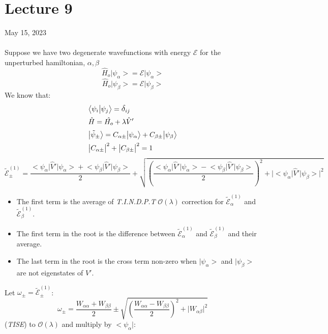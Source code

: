 \documentclass[12pt,fancychapters]{report}
\numberwithin{equation}{section}
\begin{document}
\section{Lecture 9}
May 15, 2023\\
\\
Suppose we have two degenerate wavefunctions with energy $\mathcal{E}$ for the unperturbed 
hamiltonian, $\alpha, \beta$
\[
  \hat{H}_o\big|\psi_\alpha\big> = \mathcal{E}\big|\psi_\alpha\big>
\]
\[
  \hat{H}_o\big|\psi_\beta\big> = \mathcal{E}\big|\psi_\beta\big>
\]
We know that:
\begin{align*}
  &\big<\psi_i\big|\psi_j\big>= \mathlarger{\delta}_{ij}\\ 
  &\hat{H} = \hat{H_o} + \lambda \hat{V}'\\
  &\big|\tilde{\psi}_\pm\big>= C_{\alpha\pm}\big|\psi_\alpha\big> + C_{\beta\pm}\big|
  \psi_\beta\big>\\
  &\big|C_{\alpha\pm}\big|^2 + \big|C_{\beta\pm}\big|^2 = 1
\end{align*}
\begin{equation*}
  \tilde{\mathcal{E}}_\pm^{(1)} =\frac{ \big<\psi_\alpha\big|\hat{V}'\big|\psi_\alpha\big>+
  \big<\psi_\beta\big|\hat{V}'\big|\psi_\beta\big>}{2}+ 
  \sqrt{\left(\frac{\big<\psi_\alpha\big|\hat{V}'\big|\psi_\alpha\big>- 
  \big<\psi_\beta\big|\hat{V}'\big|\psi_\beta\big>}{2}\right)^2+
\big|\big<\psi_\alpha\big|\hat{V}'\big|\psi_\beta\big>\big|^2}
\end{equation*}
\begin{itemize}
  \item The first term is the average of \emph{T.I.N.D.P.T} $\mathcal{O}(\lambda)$ correction for 
$\tilde{\mathcal{E}}_\alpha^{(1)} $ and $ \tilde{\mathcal{E}}_\beta^{(1)} $.
\item The first term in the root is the difference between $\tilde{\mathcal{E}}_\alpha^{(1)}
  $ and $ \tilde{\mathcal{E}}_\beta^{(1)} $  and their average.
\item The last term in the root is the cross term non-zero when $\big|\psi_\alpha\big>$ and 
  $\big|\psi_\beta\big>$ are not eigenstates of $\hat{V}'$.
\end{itemize}
Let $\omega_\pm = \tilde{\mathcal{E}}_\pm^{(1)}$:
\begin{equation}
  \omega_\pm =\frac{W_{\alpha\alpha} +W_{\beta\beta}}{2} \pm 
  \sqrt{\left(\frac{W_{\alpha\alpha}
  - W_{\beta\beta}}{2}\right)^2 + \big|W_{\alpha\beta}\big|^2} 
\end{equation}
(\emph{TISE}) to $\mathcal{O}(\lambda)$ and multiply by $\big<\psi_\alpha\big|$:
\end{document}
